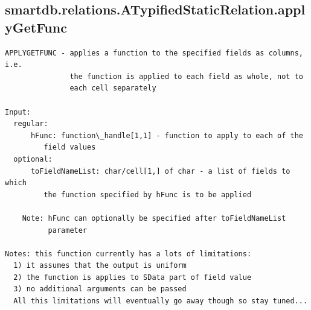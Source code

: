 \documentclass[letterpaper,10pt,english]{sphinxmanual}
\begin{document}
\subsection{smartdb.relations.ATypifiedStaticRelation.applyGetFunc}
\label{chap_functions:smartdb-relations-atypifiedstaticrelation-applygetfunc}
\begin{Verbatim}[commandchars=\\\{\}]
APPLYGETFUNC - applies a function to the specified fields as columns, i.e.
               the function is applied to each field as whole, not to
               each cell separately

Input:
  regular:
      hFunc: function\_handle[1,1] - function to apply to each of the
         field values
  optional:
      toFieldNameList: char/cell[1,] of char - a list of fields to which
         the function specified by hFunc is to be applied

    Note: hFunc can optionally be specified after toFieldNameList
          parameter

Notes: this function currently has a lots of limitations:
  1) it assumes that the output is uniform
  2) the function is applies to SData part of field value
  3) no additional arguments can be passed
  All this limitations will eventually go away though so stay tuned...
\end{Verbatim}
\end{document}
